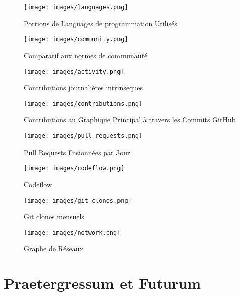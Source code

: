 \begin{figure}[htbp]
    \centering
    \texttt{[image: images/languages.png]}
    \caption{Portions de Languages de programmation Utilisés}
    \label{fig:languages}
\end{figure}

\begin{figure}[htbp]
    \centering
    \texttt{[image: images/community.png]}
    \caption{Comparatif aux normes de communauté}
    \label{fig:community}
\end{figure}

\begin{figure}[htbp]
    \centering
    \texttt{[image: images/activity.png]}
    \caption{Contributions journalières intrinsèques}
    \label{fig:activity}
\end{figure}

\begin{figure}[htbp]
    \centering
    \texttt{[image: images/contributions.png]}
    \caption{Contributions au Graphique Principal à travers les Commits GitHub}
    \label{fig:contributions}
\end{figure}

\begin{figure}[htbp]
    \centering
    \texttt{[image: images/pull\_requests.png]}
    \caption{Pull Requests Fusionnées par Jour}
    \label{fig:pull_requests}
\end{figure}

\begin{figure}[htbp]
    \centering
    \texttt{[image: images/codeflow.png]}
    \caption{Codeflow}
    \label{fig:codeflow}
\end{figure}

\begin{figure}[htbp]
    \centering
    \texttt{[image: images/git\_clones.png]}
    \caption{Git clones mensuels}
    \label{fig:git_clones}
\end{figure}

\begin{figure}[htbp]
    \centering
    \texttt{[image: images/network.png]}
    \caption{Graphe de Réseaux}
    \label{fig:network}
\end{figure}

\newpage

\part{Praetergressum et Futurum}

